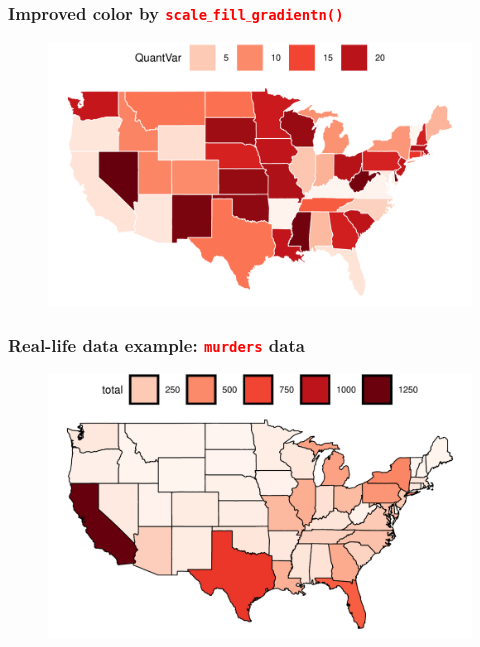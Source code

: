 \documentclass{beamer}
\begin{document}
\begin{frame}\frametitle{Improved color by \texttt{\textcolor{red}{scale$\_$fill$\_$gradientn()}}}
\begin{figure}
\includegraphics[width=0.99\linewidth]{PlotsLec4/UsaChoroplethQuant2}
\end{figure}
\end{frame}

\begin{frame}\frametitle{Real-life data example: \textcolor{red}{\texttt{murders}} data}
\begin{figure}
\includegraphics[width=0.99\linewidth]{PlotsLec4/UsaMapMurderPlt}
\end{figure}
\end{frame}
\end{document}
